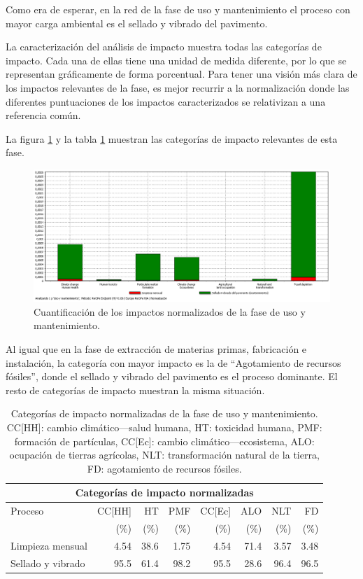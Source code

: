 Como era de esperar, en la red de la fase de uso y mantenimiento el proceso con mayor carga ambiental es el sellado y vibrado del pavimento.

La caracterización del análisis de impacto muestra todas las categorías de impacto. Cada una de ellas tiene una unidad de medida diferente, por lo que se representan gráficamente de forma porcentual. Para tener una visión más clara de los impactos relevantes de la fase, es mejor recurrir a la normalización donde las diferentes puntuaciones de los impactos caracterizados se relativizan a una referencia común.

La figura \ref{fig:uso_normalizacion} y la tabla \ref{categoriasimpactouso} muestran las categorías de impacto relevantes de esta fase.

\begin{figure}[!htb]
\centering
\includegraphics[width=15cm]{img/uso_normalizacion.png}
\caption{Cuantificación de los impactos normalizados de la fase de uso y mantenimiento.}
\label{fig:uso_normalizacion}
\end{figure}

Al igual que en la fase de extracción de materias primas, fabricación e instalación, la categoría con mayor impacto es la de ``Agotamiento de recursos fósiles'', donde el sellado y vibrado del pavimento es el proceso dominante. El resto de categorías de impacto muestran la misma situación.

\begin{table}[!htb]
\centering
\begin{tabular}{p{4cm}rrrrrrr}
\toprule
\multicolumn{8}{c}{Categorías de impacto normalizadas}\\
\midrule
Proceso & CC[HH] & HT & PMF & CC[Ec] & ALO & NLT & FD\\
 &  (\%) & (\%) & (\%) & (\%) & (\%) & (\%) & (\%)\\
\midrule
Limpieza mensual & 4.54 & 38.6 & 1.75 & 4.54 & 71.4 & 3.57 & 3.48\\
Sellado y vibrado & 95.5 & 61.4 & 98.2 & 95.5 & 28.6 & 96.4 & 96.5\\
\bottomrule
\end{tabular}
\caption[Categorías de impacto normalizadas de la fase de uso y mantenimiento.]{Categorías de impacto normalizadas de la fase de uso y mantenimiento. CC[HH]: cambio climático—salud humana, HT: toxicidad humana, PMF: formación de partículas, CC[Ec]: cambio climático—ecosistema, ALO: ocupación de tierras agrícolas, NLT: transformación natural de la tierra, FD: agotamiento de recursos fósiles.}
\label{categoriasimpactouso}
\end{table}

